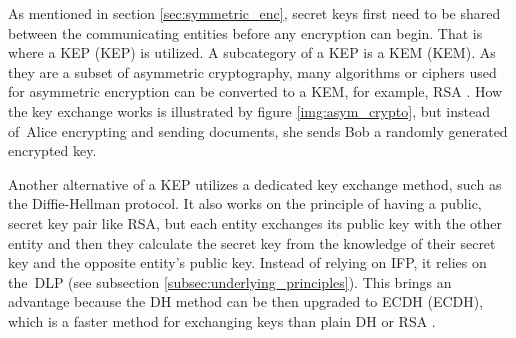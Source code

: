 As mentioned in section \ref{sec:symmetric_enc}, secret keys first need to be shared between the communicating entities before any encryption can begin. That is where a KEP (\acl{KEP}) is utilized. A subcategory of a KEP is a KEM (\acl{KEM}). As they are a subset of asymmetric cryptography, many algorithms or ciphers used for asymmetric encryption can be converted to a KEM, for example, RSA \cite{Ristic2014}. How the key exchange works is illustrated by figure \ref{img:asym_crypto}, but instead of~Alice encrypting and sending documents, she sends Bob a randomly generated encrypted key.

Another alternative of a KEP utilizes a dedicated key exchange method, such as the Diffie-Hellman protocol. It also works on the principle of having a public, secret key pair like RSA, but each entity exchanges its public key with the other entity and then they calculate the secret key from the knowledge of their secret key and the opposite entity's public key. Instead of relying on IFP, it relies on the~DLP (see subsection \ref{subsec:underlying_principles}). This brings an advantage because the DH method can be then upgraded to \acl{ECDH} (ECDH), which is a faster method for exchanging keys than plain DH or RSA \cite{Ristic2014}.
